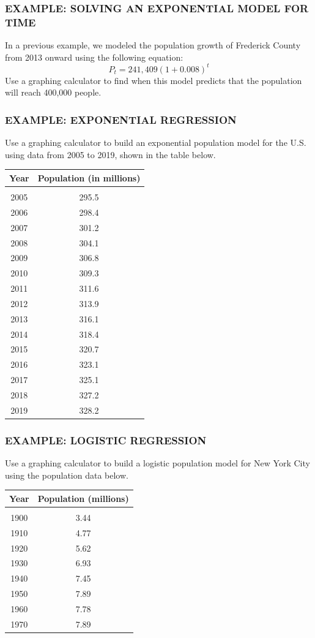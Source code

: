 \documentclass[8pt]{beamer}
\newcommand{\extitle}[1]{\frametitle{\fontfamily{fvs}\selectfont \small\color{black!70!blue!80!cyan}\uppercase{\bfseries Example: #1}}}
\begin{document}
\begin{frame}
\extitle{Solving an Exponential Model for Time}
\begin{center}
\parbox{3in}{\Large In a previous example, we modeled the population growth of Frederick County from 2013 onward using the following equation:
\[P_t = 241,409(1+0.008)^t\]
Use a graphing calculator to find when this model predicts that the population will reach 400,000 people.}
\end{center}
\end{frame}

\begin{frame}
\extitle{Exponential Regression}
Use a graphing calculator to build an exponential population model for the U.S. using data from 2005 to 2019, shown in the table below.
\begin{center}
\begin{tabular}{c c}
\textbf{Year} & \textbf{Population (in millions)}\\
\hline
& \\
2005 & 295.5\\
2006 & 298.4\\
2007 & 301.2\\
2008 & 304.1\\
2009 & 306.8\\
2010 & 309.3\\
2011 & 311.6\\
2012 & 313.9\\
2013 & 316.1\\
2014 & 318.4\\
2015 & 320.7\\
2016 & 323.1\\
2017 & 325.1\\
2018 & 327.2\\
2019 & 328.2
\end{tabular}
\end{center}
\vspace{1.5in}
\text{}
\end{frame}

\begin{frame}
\extitle{Logistic Regression}
Use a graphing calculator to build a logistic population model for New York City using the population data below.
\begin{center}
\begin{tabular}{c c}
\textbf{Year} & \textbf{Population (millions)}\\
\hline
& \\
1900 & 3.44\\
1910 & 4.77\\
1920 & 5.62\\ 
1930 & 6.93\\
1940 & 7.45\\
1950 & 7.89\\
1960 & 7.78\\
1970 & 7.89\\
\end{tabular}
\end{center}
\vspace{1.5in}
\text{}
\end{frame}
\end{document}
